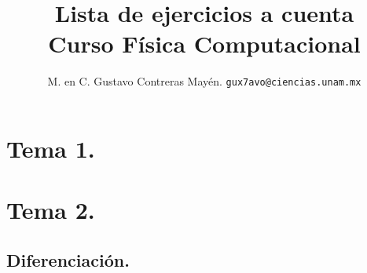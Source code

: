 

\title{\vspace{-2cm} Lista de ejercicios a cuenta \\ {\large Curso Física Computacional} \vspace{-3ex}}
\author{M. en C. Gustavo Contreras Mayén. \texttt{gux7avo@ciencias.unam.mx}}
\date{}



\fontsize{14}{14}\selectfont
\vspace{-4cm}
\maketitle


\section{Tema 1.}


\section{Tema 2.}

\subsection{Diferenciación.}


